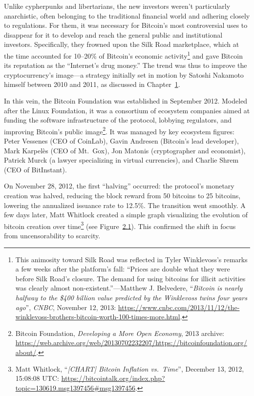 \documentclass[
  a5paper,
  smalldemyvopaper,10pt,twoside,onecolumn,openright,extrafontsizes,hidelinks]{memoir}
\begin{document}
Unlike cypherpunks and libertarians, the new investors weren't
particularly anarchistic, often belonging to the traditional financial
world and adhering closely to regulations. For them, it was necessary
for Bitcoin's most controversial uses to disappear for it to develop and
reach the general public and institutional investors. Specifically, they
frowned upon the Silk Road marketplace, which at the time accounted for
10--20\% of Bitcoin's economic activity\footnote{This animosity toward
  Silk Road was reflected in Tyler Winklevoss's remarks a few weeks
  after the platform's fall: ``Prices are double what they were before
  Silk Road's closure. The demand for using bitcoins for illicit
  activities was clearly almost non-existent.''---Matthew J. Belvedere,
  ``\emph{Bitcoin is nearly halfway to the \$400 billion value predicted
  by the Winklevoss twins four years ago}'', \emph{CNBC}, November 12,
  2013:
  \url{https://www.cnbc.com/2013/11/12/the-winklevoss-brothers-bitcoin-worth-100-times-more.html}.}
and gave Bitcoin its reputation as the ``Internet's drug money.'' The
trend was thus to improve the cryptocurrency's image---a strategy
initially set in motion by Satoshi Nakamoto himself between 2010 and
2011, as discussed in Chapter~\hyperref[ch:mythe]{1}.

In this vein, the Bitcoin Foundation was established in September 2012.
Modeled after the Linux Foundation, it was a consortium of ecosystem
companies aimed at funding the software infrastructure of the protocol,
lobbying regulators, and improving Bitcoin's public image\footnote{Bitcoin
  Foundation, \emph{Developing a More Open Economy}, 2013 archive:
  \url{https://web.archive.org/web/20130702232207/https://bitcoinfoundation.org/about/}.}.
It was managed by key ecosystem figures: Peter Vessenes (CEO of
CoinLab), Gavin Andresen (Bitcoin's lead developer), Mark Karpelès (CEO
of Mt.~Gox), Jon Matonis (cryptographer and economist), Patrick Murck (a
lawyer specializing in virtual currencies), and Charlie Shrem (CEO of
BitInstant).

On November 28, 2012, the first ``halving'' occurred: the protocol's
monetary creation was halved, reducing the block reward from 50 bitcoins
to 25 bitcoins, lowering the annualized issuance rate to 12.5\%. The
transition went smoothly. A few days later, Matt Whitlock created a
simple graph visualizing the evolution of bitcoin creation over
time\footnote{Matt Whitlock, ``\emph{{[}CHART{]} Bitcoin Inflation
  vs.~Time}'', December 13, 2012, 15:08:08 UTC:
  \url{https://bitcointalk.org/index.php?topic=130619.msg1397456\#msg1397456}.}
(see Figure~\hyperref[fig:bitcoin-inflation]{2.1}). This confirmed the
shift in focus from uncensorability to scarcity.
\end{document}
